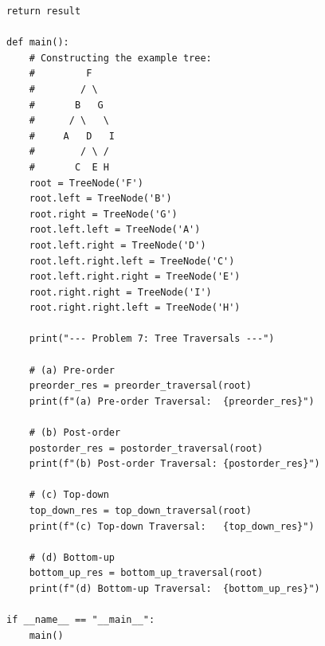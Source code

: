 \documentclass[a4paper,12pt]{article}
\begin{document}
\begin{lstlisting}[style=pythonstyle, caption={Các thuật toán duyệt cây nhị phân trong Python.}, label={lst:python_tree_traversal}]
    return result

def main():
    # Constructing the example tree:
    #         F
    #        / \
    #       B   G
    #      / \   \
    #     A   D   I
    #        / \ /
    #       C  E H
    root = TreeNode('F')
    root.left = TreeNode('B')
    root.right = TreeNode('G')
    root.left.left = TreeNode('A')
    root.left.right = TreeNode('D')
    root.left.right.left = TreeNode('C')
    root.left.right.right = TreeNode('E')
    root.right.right = TreeNode('I')
    root.right.right.left = TreeNode('H')

    print("--- Problem 7: Tree Traversals ---")
    
    # (a) Pre-order
    preorder_res = preorder_traversal(root)
    print(f"(a) Pre-order Traversal:  {preorder_res}")
    
    # (b) Post-order
    postorder_res = postorder_traversal(root)
    print(f"(b) Post-order Traversal: {postorder_res}")

    # (c) Top-down
    top_down_res = top_down_traversal(root)
    print(f"(c) Top-down Traversal:   {top_down_res}")

    # (d) Bottom-up
    bottom_up_res = bottom_up_traversal(root)
    print(f"(d) Bottom-up Traversal:  {bottom_up_res}")

if __name__ == "__main__":
    main()
\end{lstlisting}
\end{document}

